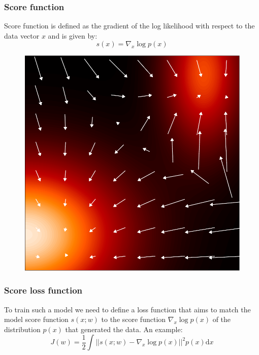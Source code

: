 \documentclass{beamer}
\begin{document}
\begin{frame}
    \frametitle{Score function}
    Score function is defined as the gradient of the log likelihood with respect to the data vector $x$ and is given by:
    \begin{equation*}
        s(x)=\nabla_{x}\log{}p(x)
    \end{equation*}
    \begin{figure}
        \includegraphics[height=0.5\textheight]{Figure_5.pdf}
    \end{figure}
\end{frame}

\begin{frame}
    \frametitle{Score loss function}
    To train such a model we need to define a loss function that aims to match the model score function $s(x;w)$ to the score function $\nabla_{x}\log{}p(x)$ of the distribution $p(x)$ that generated the data. An example:
    \begin{equation*}
        J(w)=\frac{1}{2}\int||s(x;w)-\nabla_{x}\log{}p(x)||^{2}p(x)\mathrm{d}x
    \end{equation*}
\end{frame}
\end{document}
